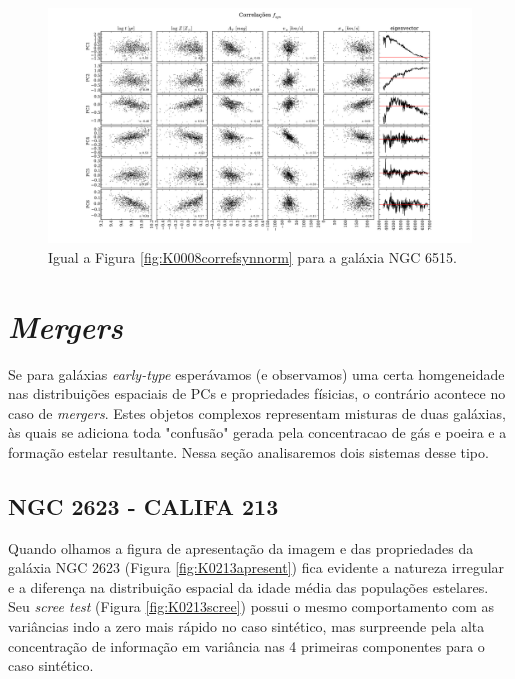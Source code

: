 \begin{figure}
    \includegraphics[width=1.3\textwidth, angle=-90]{figuras/K0864-correl-f_syn_norm-PCvsPhys.pdf}
	\caption[Correlações PCs vs. par\^ametros f\'isicos - $f_{syn}$ - NGC 6515.]
	{Igual a Figura \ref{fig:K0008correfsynnorm} para a galáxia NGC 6515.}
    \label{fig:K0864correfsynnorm}
\end{figure}

\section{{\em Mergers}}
\label{sec:result:mergers}

Se para galáxias {\em early-type} esperávamos (e observamos) uma certa homgeneidade nas distribuições espaciais de PCs e
propriedades físicias, o contrário acontece no caso de {\em mergers}. Estes objetos complexos representam misturas de
duas galáxias, às quais se adiciona toda "confusão" gerada pela concentracao de gás e poeira e a formação estelar
resultante. Nessa seção analisaremos dois sistemas desse tipo.

\subsection{NGC 2623 - CALIFA 213}

Quando olhamos a figura de apresentação da imagem e das propriedades da galáxia NGC 2623 (Figura
\ref{fig:K0213apresent}) fica evidente a natureza irregular e a diferença na distribuição espacial da idade média das
populações estelares. Seu {\em scree test} (Figura \ref{fig:K0213scree}) possui o mesmo comportamento com as variâncias
indo a zero mais rápido no caso sintético, mas surpreende pela alta concentração de informação em variância nas 4
primeiras componentes para o caso sintético.

